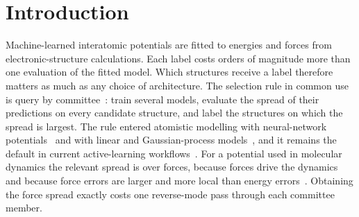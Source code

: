 
\section{Introduction}
\label{sec:intro}

Machine-learned interatomic potentials are fitted to energies and forces from
electronic-structure calculations. Each label costs orders of magnitude more
than one evaluation of the fitted model. Which structures receive a label
therefore matters as much as any choice of architecture. The selection rule in
common use is query by committee~\citep{seung1992query,krogh1995neural}: train
several models, evaluate the spread of their predictions on every candidate
structure, and label the structures on which the spread is largest. The rule
entered atomistic modelling with neural-network
potentials~\citep{artrith2012high,gastegger2017machine,smith2018less,zhang2019active,schran2020committee}
and with linear and Gaussian-process
models~\citep{podryabinkin2017active,vandermause2020flare}, and it remains the
default in current active-learning
workflows~\citep{kulichenko2023uncertainty,chepkasov2026active}. For a
potential used in molecular dynamics the relevant spread is over forces, because
forces drive the dynamics and because force errors are larger and more local
than energy errors~\citep{christensen2020role}. Obtaining the force spread
exactly costs one reverse-mode pass through each committee member.

